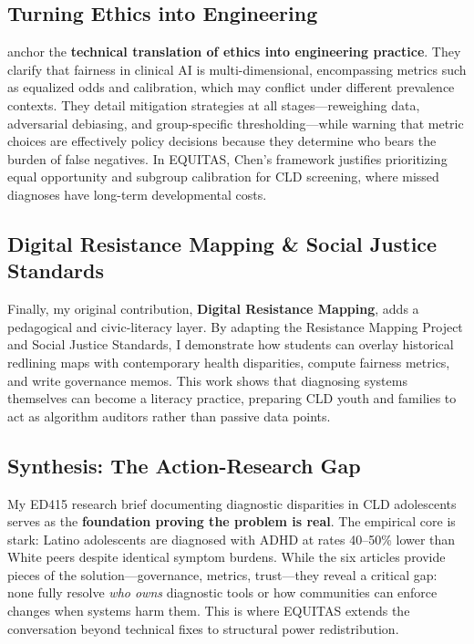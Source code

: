 \documentclass[12pt, letterpaper]{article}
\begin{document}
\subsection{Turning Ethics into Engineering}
\cite{chen2023} anchor the \textbf{technical translation of ethics into engineering practice}. They clarify that fairness in clinical AI is multi-dimensional, encompassing metrics such as equalized odds and calibration, which may conflict under different prevalence contexts. They detail mitigation strategies at all stages—reweighing data, adversarial debiasing, and group-specific thresholding—while warning that metric choices are effectively policy decisions because they determine who bears the burden of false negatives. In EQUITAS, Chen’s framework justifies prioritizing equal opportunity and subgroup calibration for CLD screening, where missed diagnoses have long-term developmental costs.

\subsection{Digital Resistance Mapping \& Social Justice Standards}
Finally, my original contribution, \textbf{Digital Resistance Mapping}, adds a pedagogical and civic-literacy layer. By adapting the Resistance Mapping Project and Social Justice Standards, I demonstrate how students can overlay historical redlining maps with contemporary health disparities, compute fairness metrics, and write governance memos. This work shows that diagnosing systems themselves can become a literacy practice, preparing CLD youth and families to act as algorithm auditors rather than passive data points.

\subsection{Synthesis: The Action-Research Gap}
My ED415 research brief documenting diagnostic disparities in CLD adolescents serves as the \textbf{foundation proving the problem is real}. The empirical core is stark: Latino adolescents are diagnosed with ADHD at rates 40–50\% lower than White peers despite identical symptom burdens. While the six articles provide pieces of the solution—governance, metrics, trust—they reveal a critical gap: none fully resolve \textit{who owns} diagnostic tools or how communities can enforce changes when systems harm them. This is where EQUITAS extends the conversation beyond technical fixes to structural power redistribution.
\end{document}
